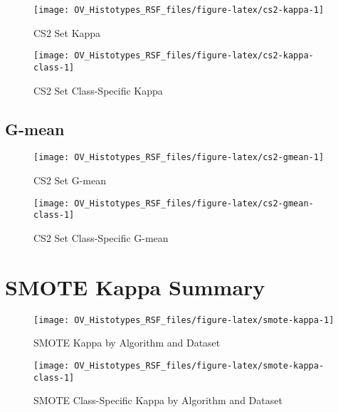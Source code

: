\documentclass[
]{report}
\begin{document}
\begin{figure}[H]

{\centering \texttt{[image: OV\_Histotypes\_RSF\_files/figure-latex/cs2-kappa-1]} 

}

\caption{CS2 Set Kappa}\label{fig:cs2-kappa}
\end{figure}

\begin{figure}[H]

{\centering \texttt{[image: OV\_Histotypes\_RSF\_files/figure-latex/cs2-kappa-class-1]} 

}

\caption{CS2 Set Class-Specific Kappa}\label{fig:cs2-kappa-class}
\end{figure}

\hypertarget{g-mean-2}{%
\subsection{G-mean}\label{g-mean-2}}

\begin{figure}[H]

{\centering \texttt{[image: OV\_Histotypes\_RSF\_files/figure-latex/cs2-gmean-1]} 

}

\caption{CS2 Set G-mean}\label{fig:cs2-gmean}
\end{figure}

\begin{figure}[H]

{\centering \texttt{[image: OV\_Histotypes\_RSF\_files/figure-latex/cs2-gmean-class-1]} 

}

\caption{CS2 Set Class-Specific G-mean}\label{fig:cs2-gmean-class}
\end{figure}

\hypertarget{smote-kappa-summary}{%
\section{SMOTE Kappa Summary}\label{smote-kappa-summary}}

\begin{figure}[H]

{\centering \texttt{[image: OV\_Histotypes\_RSF\_files/figure-latex/smote-kappa-1]} 

}

\caption{SMOTE Kappa by Algorithm and Dataset}\label{fig:smote-kappa}
\end{figure}

\begin{figure}[H]

{\centering \texttt{[image: OV\_Histotypes\_RSF\_files/figure-latex/smote-kappa-class-1]} 

}

\caption{SMOTE Class-Specific Kappa by Algorithm and Dataset}\label{fig:smote-kappa-class}
\end{figure}

  
\end{document}
